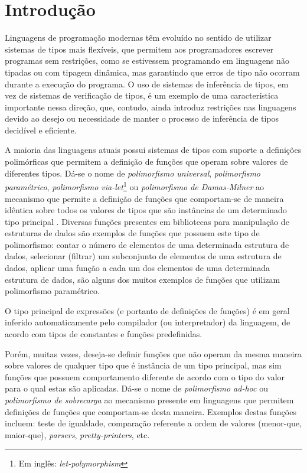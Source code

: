 \chapter{Introdu\c{c}\~ao}

Linguagens de programa\c{c}\~ao modernas t\^em evolu\'ido no sentido de
utilizar sistemas de tipos mais flex\'iveis, que permitem aos programadores
escrever programas sem restri\c{c}\~oes, como se estivessem programando em
linguagens n\~ao tipadas ou com tipagem din\^amica, mas garantindo que erros de
tipo n\~ao ocorram durante a execu\c{c}\~ao do programa. O uso de
sistemas de infer\^encia de tipos, em vez de sistemas de verifica\c{c}\~ao de
tipos, \'e um exemplo de uma caracter\'istica importante nessa dire\c{c}\~ao,
que, contudo, ainda introduz restri\c{c}\~oes nas linguagens devido ao desejo
ou necessidade de manter o processo de infer\^encia de tipos decid\'ivel e eficiente.
 
A maioria das linguagens atuais possui sistemas de tipos com suporte a
defini\c{c}\~oes polim\'orficas que permitem a defini\c{c}\~ao de
fun\c{c}\~oes que operam sobre va\-lo\-res de diferentes tipos.
D\'a-se o nome de \emph{polimorfismo universal}, \emph{polimorfismo
param\'etrico}, \emph{polimorfismo via-let}\footnote{Em
ingl\^es: \emph{let-polymorphism}} ou \emph{polimorfismo de Damas-Milner}
\cite{Mitchell96} ao mecanismo que permite a defini\c{c}\~ao de fun\c{c}\~oes que 
comportam-se de maneira id\^entica sobre todos os valores de tipos que s\~ao inst\^ancias de um determinado
tipo principal \cite{Mitchell96}.
Diversas fun\c{c}\~oes presentes em bibliotecas para manipula\c{c}\~ao de
estruturas de dados s\~ao exemplos de fun\c{c}\~oes que possuem este tipo de polimorfismo: contar o n\'umero de 
elementos de uma determinada estrutura de dados, selecionar (filtrar) um subconjunto de elementos de uma estrutura de
dados, aplicar uma fun\c{c}\~ao a cada um dos elementos de
uma determinada estrutura de dados, s\~ao alguns dos muitos exemplos de fun\c{c}\~oes que utilizam polimorfismo 
param\'etrico.

O tipo principal de express\~oes 
(e portanto de defini\c{c}\~oes de fun\c{c}\~oes) \'e em geral inferido automaticamente pelo compilador (ou
interpretador) da linguagem, de acordo com tipos de constantes e fun\c{c}\~oes
predefinidas. 

Por\'em, muitas vezes, deseja-se definir 
fun\c{c}\~oes que n\~ao operam da mesma maneira sobre valores de qualquer tipo
que \'e inst\^ancia de um tipo principal, mas sim fun\c{c}\~oes que possuem
comportamento diferente de acordo com o tipo do valor para o qual estas s\~ao aplicadas. 
D\'a-se o nome de \emph{polimorfismo ad-hoc} ou
\emph{polimorfismo de sobrecarga} ao mecanismo presente em linguagens que
permitem defini\c{c}\~oes de fun\c{c}\~oes que comportam-se desta maneira.
Exemplos destas fun\c{c}\~oes incluem: teste de igualdade, compara\c{c}\~ao
referente a ordem de valores (menor-que, maior-que), \emph{parsers}, \emph{pretty-printers}, etc.

